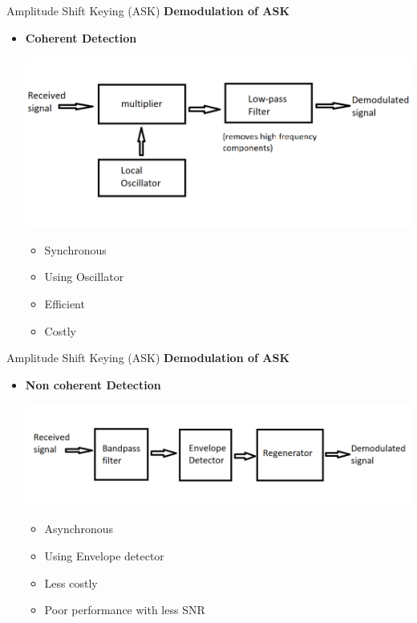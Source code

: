 \documentclass{beamer}
\begin{document}
	\begin{frame}{Amplitude Shift Keying (ASK)}
		\textbf{Demodulation of ASK}
		\begin{itemize}
			\onslide\item<1-> \textbf{Coherent Detection}
			\begin{center}
				\includegraphics[scale=0.4]{synchronous_detector.png}
			\end{center}
			
			\begin{itemize}
				\onslide\item<2-> Synchronous
				\onslide\item<2-> Using Oscillator
				\onslide\item<3-> {\color{green}Efficient}
				\onslide\item<4-> {\color{red}Costly}
			\end{itemize}
		\end{itemize}
	\end{frame}
	
	
	\begin{frame}{Amplitude Shift Keying (ASK)}
		\textbf{Demodulation of ASK}
		\begin{itemize}
			\onslide\item<1-> \textbf{Non coherent Detection}
			\begin{center}
				\includegraphics[scale=0.4]{asynchronous_detector.png}
			\end{center}
			
			\begin{itemize}
				\onslide\item<2-> Asynchronous
				\onslide\item<2-> Using Envelope detector  
				\onslide\item<3-> {\color{green}Less costly }
				\onslide\item<4-> {\color{red}Poor performance with less SNR}
			\end{itemize}
		\end{itemize}
	\end{frame}
	
\end{document}
